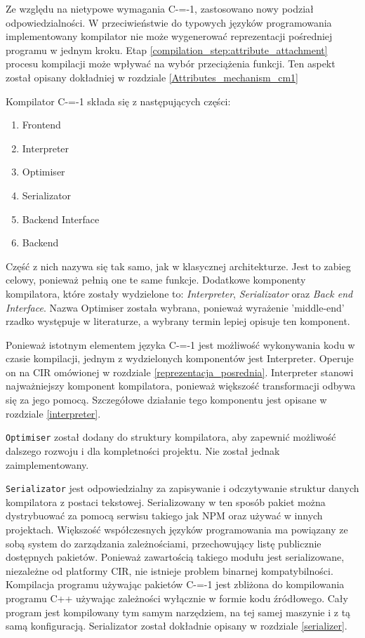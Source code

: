 Ze względu na nietypowe wymagania C-=-1, zastosowano nowy podział odpowiedzialności.
W przeciwieństwie do typowych języków programowania implementowany kompilator nie może wygenerować reprezentacji pośredniej programu w jednym kroku.
Etap \ref{compilation_step:attribute_attachment} procesu kompilacji może wpływać na wybór przeciążenia funkcji.
Ten aspekt został opisany dokładniej w rozdziale \ref{Attributes_mechanism_cm1}

Kompilator C-=-1 składa się z następujących części:
\begin{enumerate}
  \item Frontend
  \item Interpreter
  \item Optimiser
  \item Serializator
  \item Backend Interface
  \item Backend
\end{enumerate}
Część z nich nazywa się tak samo, jak w klasycznej architekturze. Jest to zabieg celowy, ponieważ pełnią one te same funkcje. 
Dodatkowe komponenty kompilatora, które zostały wydzielone to: \emph{Interpreter}, \emph{Serializator} oraz \emph{Back end Interface}. %
Nazwa Optimiser została wybrana, ponieważ wyrażenie 'middle-end' rzadko występuje w literaturze, a wybrany termin lepiej opisuje ten komponent.

Ponieważ istotnym elementem języka C-=-1 jest możliwość wykonywania kodu w czasie kompilacji, jednym z wydzielonych komponentów jest Interpreter.
Operuje on na CIR omówionej w rozdziale \ref{reprezentacja_posrednia}.
Interpreter stanowi najważniejszy komponent kompilatora, ponieważ większość transformacji odbywa się za jego pomocą. 
Szczegółowe działanie tego komponentu jest opisane w rozdziale \ref{interpreter}.

\lstinline{Optimiser} został dodany do struktury kompilatora, aby zapewnić możliwość dalszego rozwoju i dla kompletności projektu. Nie został jednak zaimplementowany.

\lstinline{Serializator} jest odpowiedzialny za zapisywanie i odczytywanie struktur danych kompilatora z postaci tekstowej.
Serializowany w ten sposób pakiet można dystrybuować za pomocą serwisu takiego jak NPM \cite{npm} oraz używać w innych projektach.
Większość współczesnych języków programowania ma powiązany ze sobą system do zarządzania zależnościami, przechowujący listę publicznie dostępnych pakietów.
Ponieważ zawartością takiego modułu jest serializowane, niezależne od platformy CIR, nie istnieje problem binarnej kompatybilności.
Kompilacja programu używając pakietów C-=-1 jest zbliżona do kompilowania programu C++ używając zależności wyłącznie w formie kodu źródłowego.
Cały program jest kompilowany tym samym narzędziem, na tej samej maszynie i z tą samą konfiguracją.
Serializator został dokładnie opisany w rozdziale \ref{serializer}.

